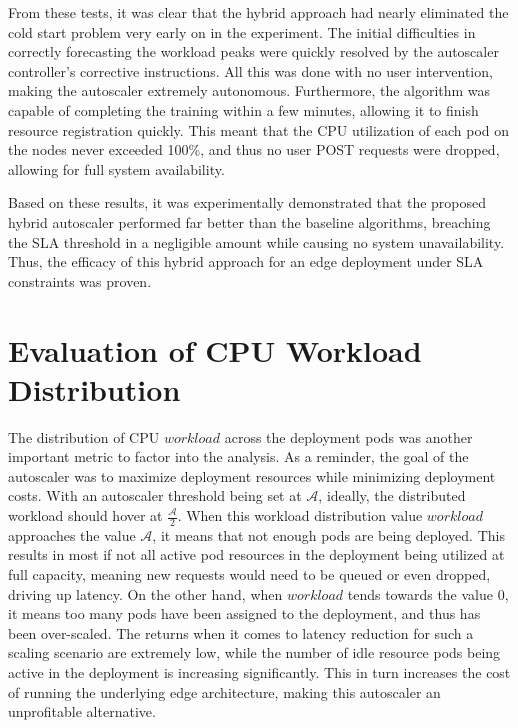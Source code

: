 From these tests, it was clear that the hybrid approach had nearly eliminated the cold start problem very early on in the experiment. The initial difficulties in correctly forecasting the workload peaks were quickly resolved by the autoscaler controller's corrective instructions. All this was done with no user intervention, making the autoscaler extremely autonomous. Furthermore, the algorithm was capable of completing the training within a few minutes, allowing it to finish resource registration quickly. This meant that the CPU utilization of each pod on the nodes never exceeded 100\%, and thus no user POST requests were dropped, allowing for full system availability.\par

Based on these results, it was experimentally demonstrated that the proposed hybrid autoscaler performed far better than the baseline algorithms, breaching the SLA threshold in a negligible amount while causing no system unavailability. Thus, the efficacy of this hybrid approach for an edge deployment under SLA constraints was proven.

\section{Evaluation of CPU Workload Distribution}
\label{sec:ch5-cpu-workload-eval}

The distribution of CPU $workload$ across the deployment pods was another important metric to factor into the analysis. As a reminder, the goal of the autoscaler was to maximize deployment resources while minimizing deployment costs. With an autoscaler threshold being set at $\mathcal{A}$, ideally, the distributed workload should hover at $\frac{\mathcal{A}}{2}$. When this workload distribution value $workload$ approaches the value $\mathcal{A}$, it means that not enough pods are being deployed. This results in most if not all active pod resources in the deployment being utilized at full capacity, meaning new requests would need to be queued or even dropped, driving up latency. On the other hand, when $workload$ tends towards the value $0$, it means too many pods have been assigned to the deployment, and thus has been over-scaled. The returns when it comes to latency reduction for such a scaling scenario are extremely low, while the number of idle resource pods being active in the deployment is increasing significantly. This in turn increases the cost of running the underlying edge architecture, making this autoscaler an unprofitable alternative.\par

